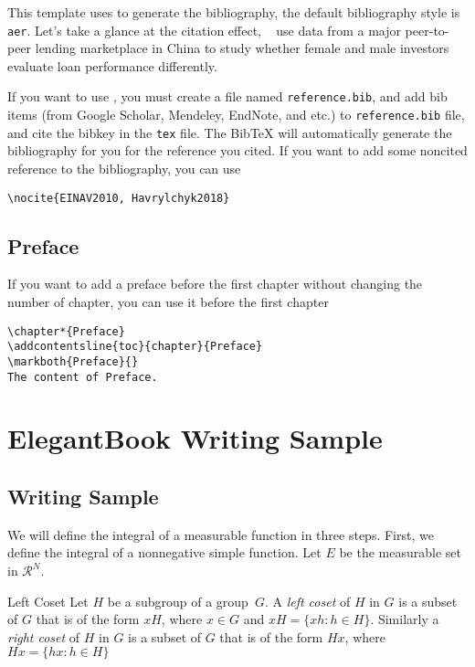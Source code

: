 \documentclass[noanswer,fancy,blue,11pt]{elegantbook}
\begin{document}
This template uses \BibTeX{} to generate the bibliography, the default bibliography style is \lstinline{aer}. Let's take a glance at the citation effect, ~\cite{Chen2018} use data from a major peer-to-peer lending marketplace in China to study whether female and male investors evaluate loan performance differently. 

If you want to use \BibTeX{}, you must create a file named \lstinline{reference.bib}, and add bib items (from Google Scholar, Mendeley, EndNote, and etc.) to \lstinline{reference.bib} file, and cite the bibkey in the \lstinline{tex} file. The Bib\TeX{} will automatically generate the bibliography for you for the reference you cited. If you want to add some noncited reference to the bibliography, you can use 
\begin{lstlisting}
\nocite{EINAV2010, Havrylchyk2018} 
\end{lstlisting}

\section{Preface}

If you want to add a preface before the first chapter without changing the number of chapter, you can use it before the first chapter 
\begin{lstlisting}
\chapter*{Preface}
\addcontentsline{toc}{chapter}{Preface} 
\markboth{Preface}{} 
The content of Preface.
\end{lstlisting}

\chapter{ElegantBook Writing Sample}
\lipsum[1]

\section{Writing Sample}

We will define the integral of a measurable function in three steps. First, we define the integral of a nonnegative simple function. Let $E$ be the measurable set in $\mathcal{R}^N$.

\begin{definition}{Left Coset}{}
Let $H$ be a subgroup of a group~$G$.  A \emph{left coset} of $H$ in $G$ is a subset of $G$ that is of the form $xH$, where $x \in G$ and $xH = \{ xh : h \in H \}$. Similarly a \emph{right coset} of $H$ in $G$ is a subset of $G$ that is of the form $Hx$, where $Hx = \{ hx : h \in H \}$
\end{definition}
\end{document}
